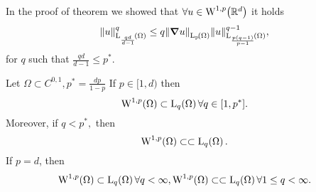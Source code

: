 \documentclass{article}
\begin{document}
\begin{remark}
    In the proof of theorem we showed that $\forall u \in \WkpSet[1][p]{\R^d}$ it holds
    \[
	    \norm{u}_{\LpSet[\frac{qd}{d-1}]{\Omega}}^q \leq q\norm{\grad u}_{\LpSet{\Omega}} \norm{u}_{\LpSet[\frac{p\qty(q-1)}{p-1}]{\Omega}}^{q-1},
    \]
    for $q$ such that $\frac{qd}{d-1}\leq p^{*}$.
\end{remark}


\begin{theorem}
	Let $\Omega \subset C^{0,1}, p^{*} = \frac{dp}{1-p}$ If $p \in [1,d)$ then
	\[
		\WkpSet[1][p]{\Omega} \subset \LpSet[q]{\Omega} \forall q \in [1,p^{*}].
	\]
	Moreover, if $q < p^{*}, $ then
	\[
		\WkpSet[1][p]{\Omega} \subset \subset \LpSet[q]{\Omega}.
	\]
	If $p=d$, then
	\[
		\WkpSet[1][p]{\Omega} \subset \LpSet[q]{\Omega} \forall q < \infty, \WkpSet[1][p]{\Omega} \subset \subset \LpSet[q]{\Omega} \forall 1 \leq q < \infty.
	\]
\end{theorem}
\end{document}

